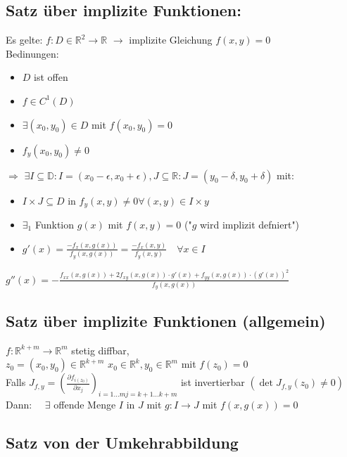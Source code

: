 \documentclass[6pt,a4paper]{scrartcl}
\renewcommand{\emph}[1]{\textbf{#1}}															%
\newcommand{\Ra}[0]{\ensuremath{\Rightarrow}}									%
\newcommand{\ra}[0]{\ensuremath{\rightarrow}} 									%
\begin{document}
\begin{multicols}{4}
\subsection{Satz über implizite Funktionen:}
Es gelte: $f: D \in \mathbb R^2 \ra \mathbb R$ \quad
$\ra $ implizite Gleichung $f(x,y) = 0$ \\
Bedinungen:
\begin{itemize} \itemsep0pt
	\item $D$ ist offen
	\item $f \in C^1 (D)$
	\item $\exists (x_0, y_0) \in D$ mit $f(x_0, y_0) = 0$
	\item $f_y(x_0, y_0) \not = 0$
\end{itemize}
\emph{$\Ra$} $ \exists I \subseteq \mathbb D: I = (x_0 - \epsilon, x_0 + \epsilon) , J \subseteq \mathbb R: J = (y_0 - \delta, y_0 + \delta)$ mit:
\begin{itemize}\itemsep0pt
	\item $I \times J \subseteq D$ in $f_y (x,y) \not = 0 \forall (x,y) \in I \times y$
	\item $\exists_1$ Funktion $g(x)$ mit $f(x,y) = 0$ ("$g$ wird implizit defniert")
	\item $g'(x) = \frac{-f_x(x, g(x))}{f_y (x, g(x))} = \frac{-f_x(x, y)}{f_y (x, y)} \quad \forall x \in I$ 
\end{itemize}

	
$g''(x) = - \frac{f_{xx} (x, g(x)) + 2f_{xy}(x,g(x)) \cdot g'(x) + f_{yy} (x, g(x)) \cdot (g'(x))^2}{f_y (x, g(x))} $

\subsection{Satz über implizite Funktionen (allgemein)}
$f: \mathbb R^{k+m} \ra \mathbb R^m$ stetig diffbar,\\ $z_0 = (x_0, y_0) \in \mathbb R^{k+m}$  	$x_0 \in \mathbb R^k, y_0 \in \mathbb R^m$ mit $f(z_0) = 0$
\\
Falls $J_{f,y} = (\frac{\partial f_{i(z_0)}}{\partial x_j})_{i = 1 \ldots m j= k +1 \ldots k+m}$ ist invertierbar $(\det J_{f,y} (z_0) \not = 0)$
\\
Dann: $\quad \exists$ offende Menge $I$ in $J$ mit $g: I \ra J$ mit $f(x,g(x)) = 0$ 


\subsection{Satz von der Umkehrabbildung}


\end{multicols}
\end{document}
